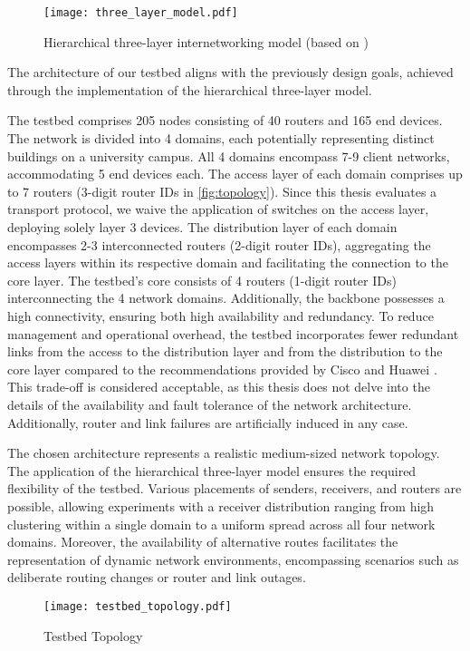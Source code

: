 \begin{figure}
    \begin{center}
        \texttt{[image: three\_layer\_model.pdf]}
    \end{center}
    \caption{Hierarchical three-layer internetworking model (based on
    \cite{cisco_3_tier})}
    \label{fig:three-layer}
\end{figure}


The architecture of our testbed aligns with the previously design goals,
    achieved through the implementation of the hierarchical three-layer model.

The testbed comprises 205 nodes consisting of 40 routers and 165 end devices.
The network is divided into 4 domains, each potentially representing distinct
    buildings on a university campus.
All 4 domains encompass 7-9 client networks, accommodating 5 end devices each.
The access layer of each domain comprises up to 7 routers (3-digit router IDs
    in \autoref{fig:topology}).
Since this thesis evaluates a transport protocol, we waive the application of
    switches on the access layer, deploying solely  layer 3 devices.
The distribution layer of each domain encompasses 2-3 interconnected routers
    (2-digit router IDs), aggregating the access layers within its respective
    domain and facilitating the connection to the core layer.
The testbed's core consists of 4 routers (1-digit router IDs) interconnecting
    the 4 network domains.
Additionally, the backbone possesses a high connectivity, ensuring both high
    availability and redundancy.
To reduce management and operational overhead, the testbed incorporates fewer
    redundant links from the access to the distribution layer and from the
    distribution to the core layer compared to the recommendations provided by
    Cisco and Huawei \cite{cisco_design_guide,huawei_campus_net}.
This trade-off is considered acceptable, as this thesis does not delve into the
    details of the availability and fault tolerance of the network
    architecture.
Additionally, router and link failures are artificially induced in any case.

The chosen architecture represents a realistic medium-sized network topology.
The application of the hierarchical three-layer model ensures the required
    flexibility of the testbed.
Various placements of senders, receivers, and routers are possible, allowing
    experiments with a receiver distribution ranging from high clustering
    within a single domain to a uniform spread across all four network domains.
Moreover, the availability of alternative routes facilitates the representation
    of dynamic network environments, encompassing scenarios such as deliberate
    routing changes or router and link outages.

\begin{figure}
    \begin{center}
        \texttt{[image: testbed\_topology.pdf]}
    \end{center}
    \caption{Testbed Topology}
    \label{fig:topology}
\end{figure}



